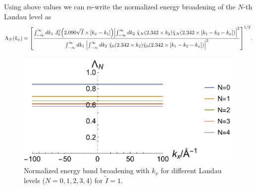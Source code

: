 \noindent
Using above values we can re-write the normalized energy broadening of the $N$-th Landau level as
\begin{equation} \label{5.24}
    \Lambda_N (k_x) =
    \qty[
    \frac
    {\int_{-\infty}^{\infty} d {k}_1 \;
    J_0^2\qty(2.090\sqrt{\tilde{I}}\times[{k}_x - {k}_1])
    \qty|
    \int_{-\infty}^{\infty} d{k}_2 \;
    \tilde{\chi}_{N}\qty(2.342 \times k_2)
    \tilde{\chi}_{N}\qty(2.342 \times \qty[{k}_1 - {k}_2 - {k}_x])|^2}
    {\int_{-\infty}^{\infty} d {k}_1 \;
    \qty|
    \int_{-\infty}^{\infty} d{k}_2 \;
    \tilde{\chi}_{0}\qty(2.342 \times k_2)
    \tilde{\chi}_{0}\qty(2.342 \times \qty[{k}_1 - {k}_2 - {k}_x])|^2}
    ]^{1/2}.
\end{equation}
\begin{figure}[ht!]
  \centering
  \includegraphics[scale=0.7]{figures/fig51.pdf}
  \caption{Normalized energy band broadening with $k_x$ for different Landau levels ($N=0,1,2,3,4$) for $\tilde{I}=1$.}
  \label{fig:5.1}
\end{figure}

